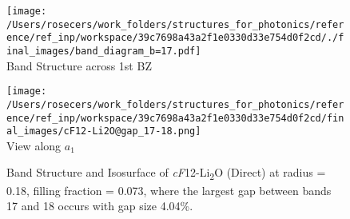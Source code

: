 \begin{figure}[H]
\begin{minipage}{0.5\textwidth}\centering
\texttt{[image: /Users/rosecers/work\_folders/structures\_for\_photonics/reference/ref\_inp/workspace/39c7698a43a2f1e0330d33e754d0f2cd/./final\_images/band\_diagram\_b=17.pdf]}
\\Band Structure across 1st BZ
\end{minipage}\hfill
\begin{minipage}{0.48\textwidth}\centering
\texttt{[image: /Users/rosecers/work\_folders/structures\_for\_photonics/reference/ref\_inp/workspace/39c7698a43a2f1e0330d33e754d0f2cd/final\_images/cF12-Li2O@gap\_17-18.png]}
\\View along $a_1$ 
\end{minipage}\hfill\caption{Band Structure and Isosurface of \textit{cF}12-Li\textsubscript{2}O (Direct) at radius = 0.18, filling fraction = 0.073, where the largest gap between bands 17 and 18 occurs with gap size 4.04\%.}

\end{figure}
\vspace{-0.25in}

